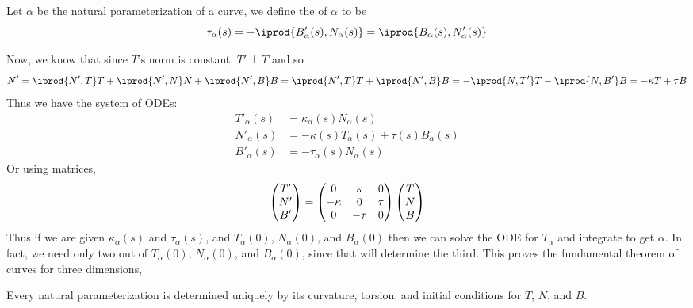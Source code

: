 \begin{defn*}

    Let $\alpha$ be the natural parameterization of a curve, we define the  of $\alpha$ to be
    \[ \tau_\alpha(s) = -\iprod{B'_\alpha(s),N_\alpha(s)} = \iprod{B_\alpha(s),N'_\alpha(s)} \]

\end{defn*}

Now, we know that since $T$'s norm is constant, $T'\perp T$ and so
\[ N' = \iprod{N',T}T + \iprod{N',N}N + \iprod{N',B}B = \iprod{N',T}T + \iprod{N',B}B = -\iprod{N,T'}T - \iprod{N,B'}B = -\kappa T + \tau B \]
Thus we have the system of ODEs:
\begin{align*}
    T'_\alpha(s) &= \kappa_\alpha(s)N_\alpha(s)\\
    N'_\alpha(s) &= -\kappa(s)T_\alpha(s) + \tau(s)B_\alpha(s) \\
    B'_\alpha(s) &= -\tau_\alpha(s)N_\alpha(s)
\end{align*}
Or using matrices,
\[ \begin{pmatrix}T'\\N'\\B'\end{pmatrix} = \begin{pmatrix}0 & \kappa & 0 \\ -\kappa & 0 & \tau \\ 0 & -\tau & 0\end{pmatrix}\begin{pmatrix}T\\N\\B\end{pmatrix} \]
Thus if we are given $\kappa_\alpha(s)$ and $\tau_\alpha(s)$, and $T_\alpha(0)$, $N_\alpha(0)$, and $B_\alpha(0)$ then we can solve the ODE for $T_\alpha$ and integrate to get $\alpha$.
In fact, we need only two out of $T_\alpha(0)$, $N_\alpha(0)$, and $B_\alpha(0)$, since that will determine the third.
This proves the fundamental theorem of curves for three dimensions,

\begin{thrm*}

    Every natural parameterization is determined uniquely by its curvature, torsion, and initial conditions for $T$, $N$, and $B$.

\end{thrm*}

